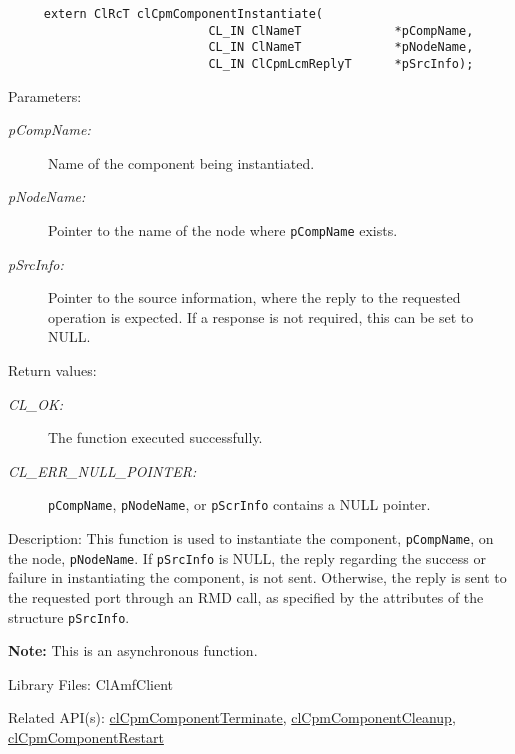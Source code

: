 {\begin{Desc}
\footnotesize\begin{verbatim}     extern ClRcT clCpmComponentInstantiate(
                			CL_IN ClNameT             *pCompName,
                			CL_IN ClNameT             *pNodeName,
                			CL_IN ClCpmLcmReplyT      *pSrcInfo);
\end{verbatim}
\normalsize
\end{Desc}
\begin{Desc}
\item[Parameters:]
\begin{description}
\item[{\em p\-Comp\-Name:}]Name of the component being instantiated. 
\item[{\em p\-Node\-Name:}]Pointer to the name of the node where {\tt{p\-Comp\-Name}} exists. 
\item[{\em p\-Src\-Info:}]Pointer to the source information, where the reply to the requested operation is expected. If a response is not required, this
can be set to NULL.\end{description}
\end{Desc}
\begin{Desc}
\item[Return values:]
\begin{description}
\item[{\em CL\_\-OK:}]The function executed successfully. 
\item[{\em CL\_\-ERR\_\-NULL\_\-POINTER:}]{\tt{p\-Comp\-Name}}, {\tt{p\-Node\-Name}}, or {\tt{p\-Scr\-Info}} contains a NULL pointer.\end{description}
\end{Desc}
\begin{Desc}
\item[Description:]This function is used to instantiate the component, {\tt{p\-Comp\-Name}}, on the node, {\tt{p\-Node\-Name}}. If {\tt{p\-Src\-Info}} is 
NULL, the reply regarding the success or failure in instantiating the component, is not sent. Otherwise, the reply is sent to the requested port through 
an RMD call, as specified by the attributes of the structure {\tt{p\-Src\-Info}}.\end{Desc}
{\bf Note:} This is an asynchronous function.
\begin{Desc}
\item[Library Files:]Cl\-Amf\-Client\end{Desc}

\begin{Desc}
\item[Related API(s):]\hyperlink{group__group14}{cl\-Cpm\-Component\-Terminate}, \hyperlink{group__group14}{cl\-Cpm\-Component\-Cleanup},
\hyperlink{group__group14}{cl\-Cpm\-Component\-Restart} \end{Desc}
\newpage








}

